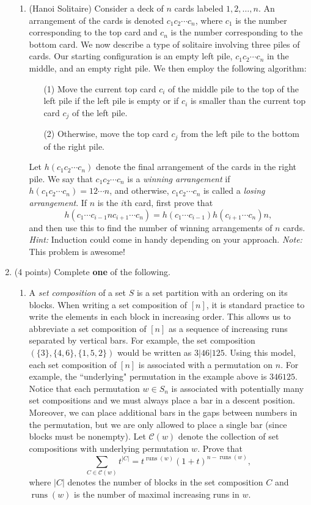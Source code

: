 \documentclass[11pt]{article}
\theoremstyle{definition}
\DeclareMathOperator{\runs}{runs}
\begin{document}
\begin{enumerate}
\begin{enumerate}
\item (Hanoi Solitaire) Consider a deck of $n$ cards labeled $1,2,\ldots, n$. An arrangement of the cards is denoted $c_1c_2\cdots c_n$, where $c_1$ is the number corresponding to the top card and $c_n$ is the number corresponding to the bottom card.  We now describe a type of solitaire involving three piles of cards. Our starting configuration is an empty left pile, $c_1c_2\cdots c_n$ in the middle, and an empty right pile. We then employ the following algorithm:
\begin{enumerate}
\item[(1)] Move the current top card $c_i$ of the middle pile to the top of the left pile if the left pile is empty or if $c_i$ is smaller than the current top card $c_j$ of the left pile.
\item[(2)] Otherwise, move the top card $c_j$ from the left pile to the bottom of the right pile. 
\end{enumerate}
Let $h(c_1c_2\cdots c_n)$ denote the final arrangement of the cards in the right pile. We say that $c_1c_2\cdots c_n$ is a \emph{winning arrangement} if $h(c_1c_2\cdots c_n)=12\cdots n$, and otherwise, $c_1c_2\cdots c_n$ is called a \emph{losing arrangement}. If $n$ is the $i$th card, first prove that 
\[
h(c_1\cdots c_{i-1}nc_{i+1}\cdots c_n)=h(c_1\cdots c_{i-1})h(c_{i+1}\cdots c_n)n,
\]
and then use this to find the number of winning arrangements of $n$ cards. \emph{Hint:} Induction could come in handy depending on your approach. \emph{Note:} This problem is awesome!

\end{enumerate}

\item (4 points) Complete \textbf{one} of the following.
\begin{enumerate}
\item A \emph{set composition} of a set $S$ is a set partition with an ordering on its blocks. When writing a set composition of $[n]$, it is standard practice to write the elements in each block in increasing order. This allows us to abbreviate a set composition of $[n]$ as a sequence of increasing runs separated by vertical bars. For example, the set composition $(\{3\},\{4,6\},\{1,5,2\})$ would be written as $3|46|125$. Using this model, each set composition of $[n]$ is associated with a permutation on $n$. For example, the ``underlying" permutation in the example above is $346125$. Notice that each permutation $w\in S_n$ is associated with potentially many set compositions and we must always place a bar in a descent position. Moreover, we can place additional bars in the gaps between numbers in the permutation, but we are only allowed to place a single bar (since blocks must be nonempty). Let $\mathcal{C}(w)$ denote the collection of set compositions with underlying permutation $w$. Prove that
\[
\sum_{C\in\mathcal{C}(w)}t^{|C|}=t^{\runs(w)}(1+t)^{n-\runs(w)},
\]
where $|C|$ denotes the number of blocks in the set composition $C$ and $\runs(w)$ is the number of maximal increasing runs in $w$.


\end{enumerate}
\end{enumerate}
\end{document}
